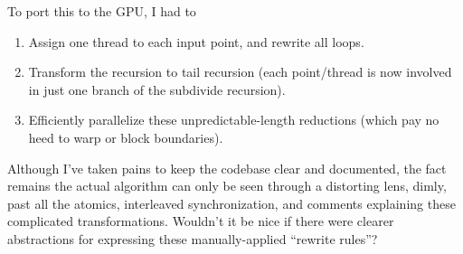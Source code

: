 To port this to the GPU, I had to
\begin{enumerate}
  \item Assign one thread to each input point, and rewrite all loops.

  \item Transform the recursion to tail recursion (each point/thread
  is now involved in just one branch of the subdivide recursion).

  \item Efficiently parallelize these unpredictable-length reductions (which pay
  no heed to warp or block boundaries).
\end{enumerate}

Although I've taken pains to keep the codebase clear and documented,
the fact remains the actual algorithm can only be seen through a
distorting lens, dimly, past all the atomics, interleaved
synchronization, and comments explaining these complicated
transformations.  Wouldn't it be nice if there were clearer
abstractions for expressing these manually-applied ``rewrite rules''?






